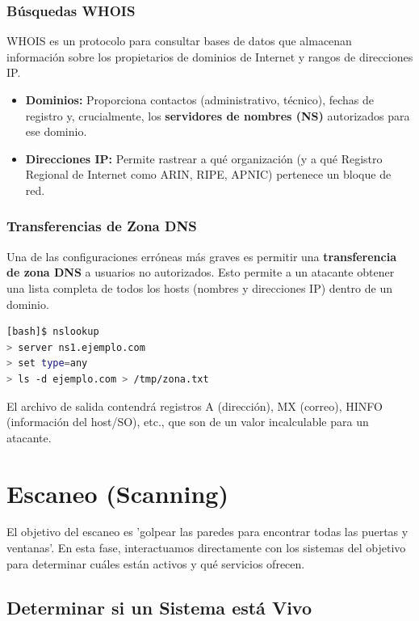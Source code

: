\documentclass[12pt,a4paper]{article}
\begin{document}
\subsubsection{Búsquedas WHOIS}

WHOIS es un protocolo para consultar bases de datos que almacenan información sobre los propietarios de dominios de Internet y rangos de direcciones IP.
\begin{itemize}
    \item \textbf{Dominios:} Proporciona contactos (administrativo, técnico), fechas de registro y, crucialmente, los \textbf{servidores de nombres (NS)} autorizados para ese dominio.
    \item \textbf{Direcciones IP:} Permite rastrear a qué organización (y a qué Registro Regional de Internet como ARIN, RIPE, APNIC) pertenece un bloque de red.
\end{itemize}

\subsubsection{Transferencias de Zona DNS}

Una de las configuraciones erróneas más graves es permitir una \textbf{transferencia de zona DNS} a usuarios no autorizados. Esto permite a un atacante obtener una lista completa de todos los hosts (nombres y direcciones IP) dentro de un dominio.

\begin{lstlisting}[language=bash, caption={Ejemplo de transferencia de zona con nslookup}]
[bash]$ nslookup
> server ns1.ejemplo.com
> set type=any
> ls -d ejemplo.com > /tmp/zona.txt
\end{lstlisting}

El archivo de salida contendrá registros A (dirección), MX (correo), HINFO (información del host/SO), etc., que son de un valor incalculable para un atacante.

\section{Escaneo (Scanning)}

El objetivo del escaneo es 'golpear las paredes para encontrar todas las puertas y ventanas'. En esta fase, interactuamos directamente con los sistemas del objetivo para determinar cuáles están activos y qué servicios ofrecen.

\subsection{Determinar si un Sistema está Vivo}
\end{document}
